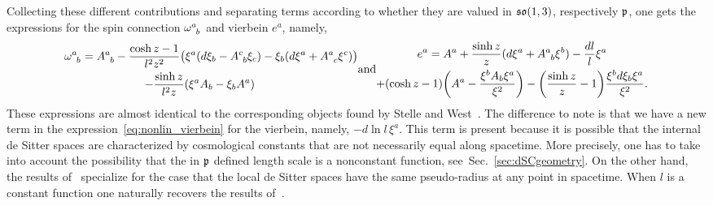 \documentclass[
final,
11pt,
a4paper,
DIV=11,
headinclude=true,
footinclude=false,
bibliography=totoc,
twoside=true,  %
BCOR=5mm
]{scrbook}
\begin{document}
Collecting these different contributions and separating terms 
according to whether they are valued in $\mathfrak{so}(1,3)$, 
respectively $\mathfrak{p}$, one gets the expressions for the spin 
connection $\omega\ind{^a_b}$ and vierbein $e^a$, namely,
\begin{subequations}
\label{eqs:nonlin_spin_vier}
  \begin{multline}
    \label{eq:nonlin_spinconn}
    \omega\ind{^a_b} = A\ind{^a_b} - \frac{\cosh z - 1}{l^2 z^2} 
    \big( \xi^a (d\xi_b - A\ind{^c_b} \xi_c) - \xi_b (d\xi^a 
    + A\ind{^a_c} \xi^c) \big) \\
    - \frac{\sinh z}{l^2 z} (\xi^a A_b - \xi_b A^a)
    \hspace{2em}
  \end{multline}
  \\
  \text{and}
  \begin{multline}
    \label{eq:nonlin_vierbein}
    e^a = A^a + \frac{\sinh z}{z}( d\xi^a + A\ind{^a_b} 
    \xi^b) - \frac{dl}{l} \xi ^a \\
    + (\cosh z - 1) \bigg( A^a - \frac{\xi^b A_b \xi^a}{\xi^2} 
    \bigg) - \bigg( \frac{\sinh z}{z} - 1 \bigg) \frac{\xi^b 
      d\xi_b \xi^a}{\xi^2}.
  \end{multline}
\end{subequations}
These expressions are almost identical to the corresponding 
objects found by Stelle and West~\cite{stelle.west:1980ds}. The 
difference to note is that we have a new term in the 
expression~\eqref{eq:nonlin_vierbein} for the vierbein, namely, 
$-d\ln l\,\xi^a$. This term is present because it is possible 
that the internal de Sitter spaces are characterized by 
cosmological constants that are not necessarily equal along 
spacetime. More precisely, one has to take into account the 
possibility that the in $\mathfrak{p}$ defined length scale is 
a nonconstant function, see~Sec.~\ref{sec:dSCgeometry}. On the 
other hand, the results of~\cite{stelle.west:1980ds} specialize 
for the case that the local de Sitter spaces have the same 
pseudo-radius at any point in spacetime. When $l$ is a constant 
function one naturally recovers the results 
of~\cite{stelle.west:1980ds}. 
\end{document}
